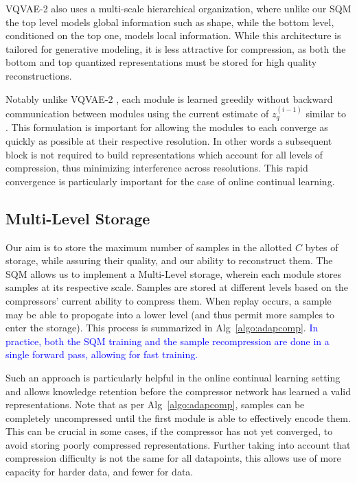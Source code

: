 \documentclass[colorinlistoftodos]{article} %
\newcommand\mynotesLC[1]{\textcolor{blue}{#1}}
\begin{document}
VQVAE-2 \citep{razavi2019generating} also uses a multi-scale hierarchical organization, where unlike our SQM the top level models global information such as shape, while the bottom level, conditioned on the top one, models local information. While this architecture is tailored for generative modeling, it is less attractive for compression, as both the bottom and top quantized representations must be stored for high quality reconstructions.

Notably unlike VQVAE-2 \citep{razavi2019generating}, each module is learned greedily without backward communication between modules using the current estimate of $z_q^{(i-1)}$ similar to \cite{belilovsky2019decoupled,nokland2019training}. This formulation is important for allowing the modules to each converge as quickly as possible at their respective resolution. In other words a subsequent block is not required to build representations which account for all levels of compression, thus minimizing interference across resolutions. This rapid convergence is particularly important for the case of online continual learning. 

\subsection{Multi-Level Storage}\label{sec:adap}
Our aim is to store the maximum number of samples in the allotted $C$ bytes of storage, while assuring their quality, and our ability to reconstruct them. The SQM allows us to implement a Multi-Level storage, wherein each module stores samples at its respective scale. Samples are stored at different levels based on the compressors' current ability to compress them. When replay occurs, a sample may be able to propogate into a lower level (and thus permit more samples to enter the storage). This process is summarized in Alg~\ref{algo:adapcomp}. \mynotesLC{In practice, both the SQM training and the sample recompression are done in a single forward pass, allowing for fast training.}

 Such an approach is particularly helpful in the online continual learning setting and allows knowledge retention before the compressor network has learned a valid representations. Note that as per Alg~\ref{algo:adapcomp}, samples can be completely uncompressed until the first module is able to effectively encode them.  This can be crucial in some cases, if the compressor has not yet converged, to avoid storing poorly compressed representations.  Further taking into account that compression difficulty is not the same for all datapoints, this allows use of more capacity for harder data, and fewer for data.
\end{document}
